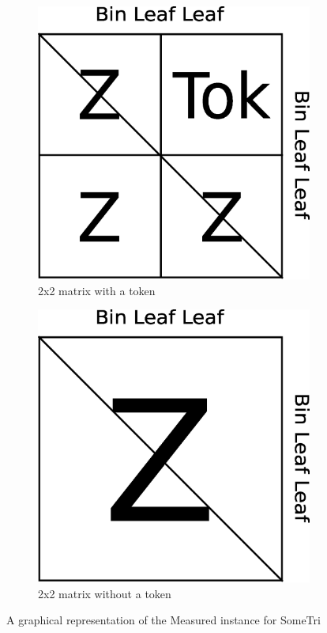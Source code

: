 \documentclass[a4paper,12pt,twosided]{report}
\begin{document}
\begin{figure}[H]
\centering
\begin{subfigure}[H]{.4\textwidth}
\includegraphics[width=.9\textwidth]{matrix2x2-token.eps}
\caption{2x2 matrix with a token}
\end{subfigure}
\begin{subfigure}[H]{.4\textwidth}
\includegraphics[width=.9\textwidth]{matrix2x2-zero.eps}
\caption{2x2 matrix without a token}
\end{subfigure}
\caption{\label{measurematrix} A graphical representation of the Measured
instance for SomeTri}
\end{figure}
\end{document}

